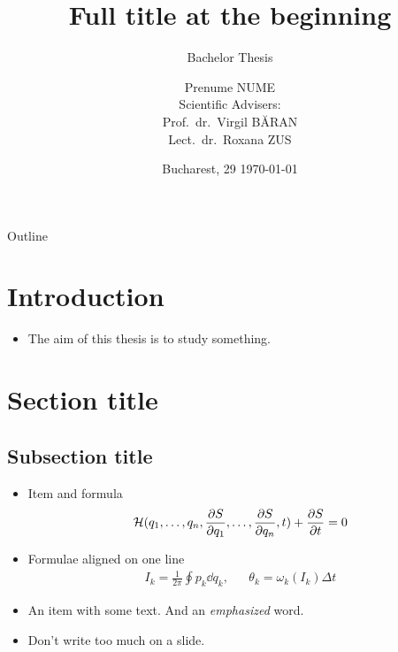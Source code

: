 \documentclass[a4,compress]{beamer}
\title[Title (appears on every slide)]{Full title at the beginning}
\subtitle{Bachelor Thesis}
\author{
  Prenume NUME \\
   \hspace{6cm} {\small	Scientific Advisers:} \\
   \hspace{6.35cm} {\small Prof.~dr.~Virgil BĂRAN} \\
   \hspace{6.35cm} {\small Lect.~dr.~Roxana ZUS}
}
\institute[Universitatea din București]
{
  Universitatea din București \\
  Facultatea de Fizică
}
\date{\small Bucharest, 29 \printdayoff\today}
\theoremstyle{plain}
\theoremstyle{definition}
\begin{document}

\begin{frame}[plain]
 \titlepage
\end{frame}


\begin{frame}{Outline}
  \tableofcontents[]
\end{frame}

\section[Intro]{Introduction}


\begin{frame}
  \begin{itemize}
    \item The aim of this thesis is to study something.
  \end{itemize}
\end{frame}

\section[Short title]{Section title}

\subsection{Subsection title}


\begin{frame}
  \begin{itemize}
    \item Item and formula
    \begin{equation*}
      \label{eq:hamilton-jacobi-first}
      \mathcal{H}(q_1,\dotsc,q_n,\pdv{S}{q_1},\dotsc,\pdv{S}{q_n},t) + \pdv{S}{t} = 0
    \end{equation*}
    \item Formulae aligned on one line
    \begin{align*}
      I_k = \frac{1}{2\pi}\oint p_k \dd{q_k}, &&
      \theta_k = \omega_k(I_k) \Delta t
    \end{align*}
    \item An item with some text. And an \emph{emphasized} word.
    \item Don't write too much on a slide.
  \end{itemize}
\end{frame}
\end{document}
